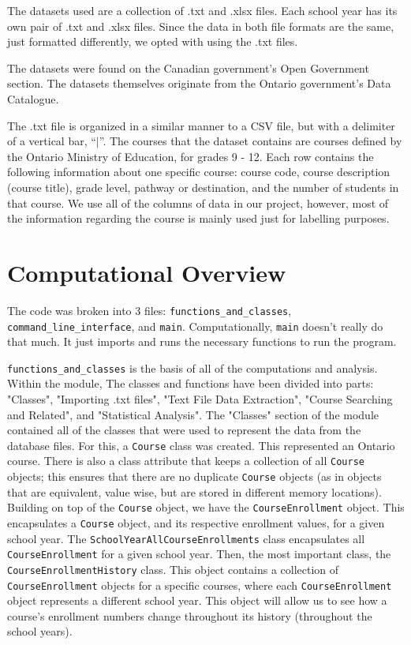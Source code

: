 \documentclass[fontsize=11pt]{article}
\begin{document}
The datasets used are a collection of .txt and .xlsx files. Each school year has its own pair of .txt and .xlsx files. Since the data in both file formats are the same, just formatted differently, we opted with using the .txt files.

The datasets were found on the Canadian government’s Open Government section. The datasets themselves originate from the Ontario government’s Data Catalogue.

The .txt file is organized in a similar manner to a CSV file, but with a delimiter of a vertical bar, “$\mid$”. The courses that the dataset contains are courses defined by the Ontario Ministry of Education, for grades 9 - 12. Each row contains the following information about one specific course: course code, course description (course title), grade level, pathway or destination, and the number of students in that course. We use all of the columns of data in our project, however, most of the information regarding the course is mainly used just for labelling purposes.

\section*{Computational Overview}  %

The code was broken into 3 files: \texttt{functions\_and\_classes}, \texttt{command\_line\_interface}, and \texttt{main}.
Computationally, \texttt{main} doesn't really do that much. It just imports and runs the necessary functions
to run the program.

\texttt{functions\_and\_classes} is the basis of all of the computations and analysis. Within the module,
The classes and functions have been divided into parts: "Classes", "Importing .txt files", "Text File Data Extraction",
"Course Searching and Related", and "Statistical Analysis".
The "Classes" section of the module contained all of the classes that were used to represent the data
from the database files. For this, a \texttt{Course} class was created. This represented an Ontario course.
There is also a class attribute that keeps a collection of all \texttt{Course} objects; this ensures that
there are no duplicate \texttt{Course} objects (as in objects that are equivalent, value wise, but are stored in different memory locations).
Building on top of the \texttt{Course} object, we have the \texttt{CourseEnrollment} object.
This encapsulates a \texttt{Course} object, and its respective enrollment values, for a given school year.
The \texttt{SchoolYearAllCourseEnrollments} class encapsulates all \texttt{CourseEnrollment} for a given school year.
Then, the most important class, the \texttt{CourseEnrollmentHistory} class. This object contains a
collection of \texttt{CourseEnrollment} objects for a specific courses, where each \texttt{CourseEnrollment} object
represents a different school year. This object will allow us to see how a course's enrollment numbers
change throughout its history (throughout the school years).
\end{document}
